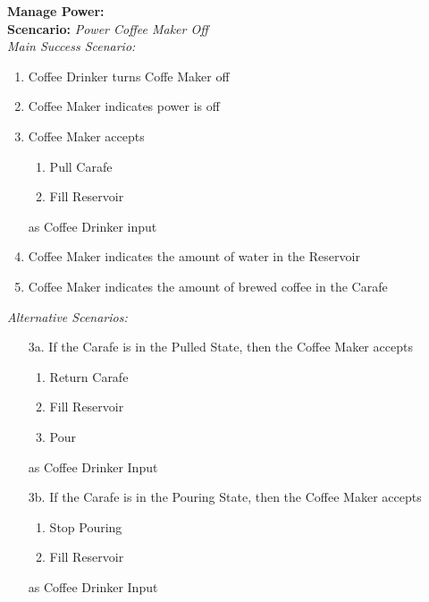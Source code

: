 \documentclass[letterpaper]{article}
\begin{document}
\noindent
\textbf{Manage Power:}\\
\textbf{Scencario:  }\textit{Power Coffee Maker Off}\\
\textit{Main Success Scenario:}\\
\begin{enumerate}
\item Coffee Drinker turns Coffe Maker off
\item Coffee Maker indicates power is off
\item Coffee Maker accepts
\begin{enumerate}
\item Pull Carafe
\item Fill Reservoir
\end{enumerate}
as Coffee Drinker input
\item Coffee Maker indicates the amount of water in the Reservoir
\item Coffee Maker indicates the amount of brewed coffee in the
 Carafe
\end{enumerate}
\textit{Alternative Scenarios:}
\begin{enumerate}
\item[3a.]If the Carafe is in the Pulled State, then the Coffee Maker
accepts
\begin{enumerate}
\item Return Carafe
\item Fill Reservoir
\item Pour
\end{enumerate}
as Coffee Drinker Input
\item[3b.]If the Carafe is in the Pouring State, then the Coffee Maker
accepts
\begin{enumerate}
\item Stop Pouring
\item Fill Reservoir
\end{enumerate}
as Coffee Drinker Input
\end{enumerate}
\end{document}
